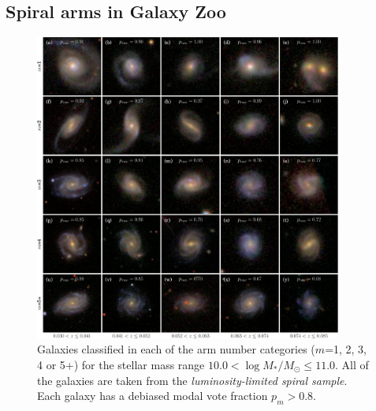 \documentclass[useAMS,usenatbib]{mn2e}
\begin{document}
\subsection{Spiral arms in Galaxy Zoo}
\label{sec:defining_the_sample}

\begin{figure}
		\centering

        \includegraphics[width=0.9\textwidth]{Images/Results/image_page_p0810_m106110.pdf}

        \caption{Galaxies classified in each of the arm number categories ($m$=1, 2, 3, 4 or 5+) for the stellar mass range $10.0 < \log{M_*/M_{\odot}} \leq 11.0$. All of the galaxies are taken from the \textit{luminosity-limited spiral sample}. Each galaxy has a debiased modal vote fraction $p_m>0.8$.}

        \label{fig:image_panel_secure}

\end{figure}
\end{document}
